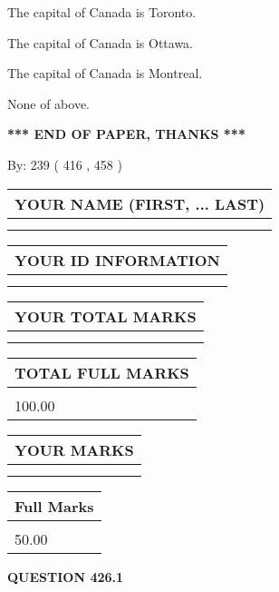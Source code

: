 \documentclass[12pt]{article}
\begin{document}
  
 
 
The capital of Canada is Toronto.
 
 
The capital of Canada is Ottawa.
 
 
The capital of Canada is Montreal.
 
 
 None of above.
 
 
   
   
\vspace{1.0in} 
{\textbf{\large{ *** END OF PAPER, THANKS *** }}} 
   
   
\hspace{1.0in} By: 
 239 ( 416 ,  458 )
   
   
   
   
\newpage 
\setcounter{page}{ 
   426001 } 
   
   
   
   
\noindent\begin{tabular}{|l|}
\hline
YOUR NAME (FIRST, ... LAST)  \\
\hline
 \\ 
 \\ 
\hline
\end{tabular}
\hspace{0.05in} \begin{tabular}{|l|}
\hline
 YOUR   ID   INFORMATION  \\
\hline
 \\ 
 \\ 
\hline
\end{tabular}
   
   
\vspace{0.2in}\noindent\begin{tabular}{|l|}
\hline
YOUR TOTAL MARKS  \\
\hline
 \\ 
 \\ 
\hline
\end{tabular}
\hspace{0.05in} \begin{tabular}{|l|}
\hline
TOTAL FULL MARKS  \\
\hline
 \\ 
100.00 \\
\hline
\end{tabular}
  
\vspace{0.2in}
  
\noindent\begin{tabular}{|l|}
\hline
 YOUR MARKS  \\
\hline
 \\ 
 \\ 
\hline
\end{tabular}
\hspace{0.05in} \begin{tabular}{|l|}
\hline
 Full Marks  \\
\hline
 \\ 
50.00 \\
\hline
\end{tabular}
{\textbf{\Large{QUESTION
426.1 
}}}
  
\end{document}
